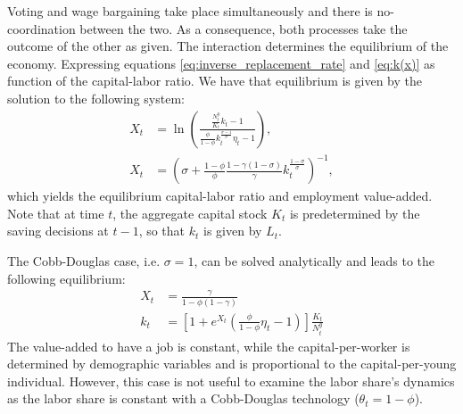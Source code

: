 Voting and wage bargaining take place simultaneously and there is no-coordination between the two. As a consequence, both processes take the outcome of the other as given. The interaction determines the equilibrium of the economy. Expressing equations \eqref{eq:inverse_replacement_rate} and \eqref{eq:k(x)} as function of the capital-labor ratio. We have that equilibrium is given by the solution to the following system:
	\begin{align}
		\label{eq:Xg} 
		X_t &= \ln\left( \frac{ \frac{N_t^y}{K_t} k_t - 1 } { \frac{\phi}{1-\phi} k_t^{\frac{\sigma-1}{\sigma}} \eta_t - 1 }\right), \\
		\label{eq:Xh}
		X_t &= \left( \sigma + \frac{1-\phi}{\phi} \frac{1-\gamma(1-\sigma)}{\gamma} k_t^{\frac{1-\sigma}{\sigma}} \right)^{-1},
	\end{align}
which yields the equilibrium capital-labor ratio and employment value-added. Note that at time $t$, the aggregate capital stock $K_t$ is predetermined by the saving decisions at $t-1$, so that $k_t$ is given by $L_t$.

The Cobb-Douglas case, i.e. $\sigma = 1$, can be solved analytically and leads to the following equilibrium:
	\begin{align*}
		X_t &= \frac{\gamma}{1-\phi(1-\gamma)} \\
		k_t &= \left[1 + e^{X_t}\left(\frac{\phi}{1-\phi}\eta_t-1\right)\right]\frac{K_t}{N_t^y}
	\end{align*}
The value-added to have a job is constant, while the capital-per-worker is determined by demographic variables and is proportional to the capital-per-young individual. However, this case is not useful to examine the labor share's dynamics as the labor share is constant with a Cobb-Douglas technology ($\theta_t = 1-\phi$).

